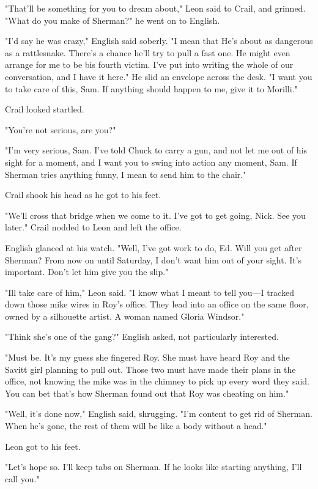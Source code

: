 \documentclass{novel}
\begin{document}
"That'll be something for you to dream about," Leon said to Crail, and grinned. "What do you make of Sherman?" he went on to English.

"I'd say he was crazy," English said soberly. "I mean that He's about as dangerous as a rattlesnake. There's a chance he'll try to pull a fast one. He might even arrange for me to be bis fourth victim. I've put into writing the whole of our conversation, and I have it here." He slid an envelope across the desk. "I want you to take care of this, Sam. If anything should happen to me, give it to Morilli."

Crail looked startled.

"You're not serious, are you?"

"I'm very serious, Sam. I've told Chuck to carry a gun, and not let me out of his sight for a moment, and I want you to swing into action any moment, Sam. If Sherman tries anything funny, I mean to send him to the chair."

Crail shook his head as he got to his feet.

"We'll cross that bridge when we come to it. I've got to get going, Nick. See you later." Crail nodded to Leon and left the office.

English glanced at his watch. "Well, I've got work to do, Ed. Will you get after Sherman? From now on until Saturday, I don't want him out of your sight. It's important. Don't let him give you the slip."

"Ill take care of him," Leon said. "I know what I meant to tell you—I tracked down those mike wires in Roy's office. They lead into an office on the same floor, owned by a silhouette artist. A woman named Gloria Windsor."

"Think she's one of the gang?" English asked, not particularly interested.

"Must be. It's my guess she fingered Roy. She must have heard Roy and the Savitt girl planning to pull out. Those two must have made their plans in the office, not knowing the mike was in the chimney to pick up every word they said. You can bet that's how Sherman found out that Roy was cheating on him."

"Well, it's done now," English said, shrugging. "I'm content to get rid of Sherman. When he's gone, the rest of them will be like a body without a head."

Leon got to his feet.

"Let's hope so. I'll keep tabs on Sherman. If he looks like starting anything, I'll call you."
\end{document}
